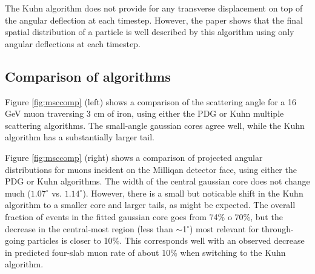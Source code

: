 \documentclass[11pt]{article}
\begin{document}
The Kuhn algorithm does not provide for any transverse displacement on top of the angular deflection at each timestep.
However, the paper shows that the final spatial distribution of a particle is well described by this algorithm
using only angular deflections at each timestep.

\subsection{Comparison of algorithms}
Figure \ref{fig:msccomp} (left) shows a comparison of the scattering angle for a 16 GeV muon traversing 3 cm of iron,
using either the PDG or Kuhn multiple scattering algorithms. The small-angle gaussian cores agree well, while the 
Kuhn algorithm has a substantially larger tail.

Figure \ref{fig:msccomp} (right) shows a comparison of projected angular distributions for muons incident on the Milliqan detector face,
using either the PDG or Kuhn algorithms. The width of the central gaussian core does not change much
($1.07^\circ$ vs. $1.14^\circ$). However, there is a small but noticable shift in the Kuhn algorithm to a smaller core and
larger tails, as might be expected. The overall fraction of events in the fitted gaussian core goes from 74\% o 70\%,
but the decrease in the central-most region (less than $\sim$1$^\circ$) most relevant for through-going particles
is closer to 10\%. This corresponds well with an observed decrease in predicted four-slab muon rate of
about 10\% when switching to the Kuhn algorithm.
\end{document}
